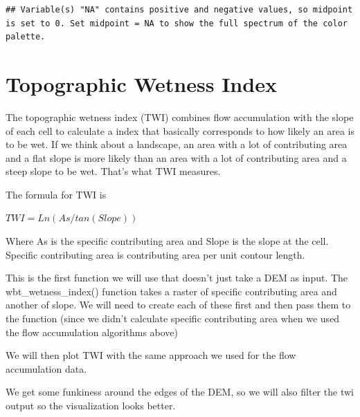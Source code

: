 \documentclass[
]{book}
\begin{document}
\begin{verbatim}
## Variable(s) "NA" contains positive and negative values, so midpoint is set to 0. Set midpoint = NA to show the full spectrum of the color palette.
\end{verbatim}

\hypertarget{topographic-wetness-index}{%
\section{Topographic Wetness Index}\label{topographic-wetness-index}}

The topographic wetness index (TWI) combines flow accumulation with the slope of each cell to calculate a index that basically corresponds to how likely an area is to be wet. If we think about a landscape, an area with a lot of contributing area and a flat slope is more likely than an area with a lot of contributing area and a steep slope to be wet. That's what TWI measures.

The formula for TWI is

\(TWI = Ln(As / tan(Slope))\)

Where As is the specific contributing area and Slope is the slope at the cell. Specific contributing area is contributing area per unit contour length.

This is the first function we will use that doesn't just take a DEM as input. The wbt\_wetness\_index() function takes a raster of specific contributing area and another of slope. We will need to create each of these first and then pass them to the function (since we didn't calculate specific contributing area when we used the flow accumulation algorithms above)

We will then plot TWI with the same approach we used for the flow accumulation data.

We get some funkiness around the edges of the DEM, so we will also filter the twi output so the visualization looks better.
\end{document}
